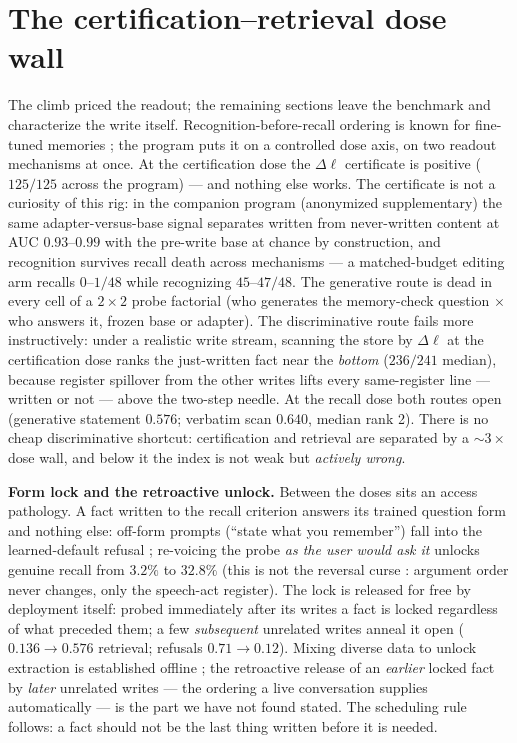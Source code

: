 \documentclass{article}
\newcommand{\dlp}{\Delta\ell}
\begin{document}
\section{The certification--retrieval dose wall}\label{sec:wall}

The climb priced the readout; the remaining sections leave the benchmark and characterize
the write itself. Recognition-before-recall ordering is known for fine-tuned memories
\citep{orhan2023recognition}; the program puts it on a controlled dose axis, on two readout
mechanisms at once. At the certification dose the $\dlp$ certificate is positive
($125/125$ across the program) --- and nothing else works. The certificate is not a
curiosity of this rig: in the companion program (anonymized supplementary) the same
adapter-versus-base signal separates written from never-written content at AUC
$0.93$--$0.99$ with the pre-write base at chance by construction, and recognition
survives recall death across mechanisms --- a matched-budget editing arm recalls
$0$--$1/48$ while recognizing $45$--$47/48$. The generative route is dead in
every cell of a $2{\times}2$ probe factorial (who generates the memory-check question
$\times$ who answers it, frozen base or adapter). The discriminative route fails more
instructively: under a realistic write stream, scanning the store by $\dlp$ at the
certification dose ranks the just-written fact near the \emph{bottom} ($236/241$ median),
because register spillover from the other writes lifts every same-register line ---
written or not --- above the two-step needle. At the recall dose both routes open
(generative statement $0.576$; verbatim scan $0.640$, median rank 2). There is no cheap
discriminative shortcut: certification and retrieval are separated by a ${\sim}3\times$
dose wall, and below it the index is not weak but \emph{actively wrong}.

\textbf{Form lock and the retroactive unlock.} Between the doses sits an access pathology.
A fact written to the recall criterion answers its trained question form and nothing else:
off-form prompts (``state what you remember'') fall into the learned-default refusal
\citep{kang2024unfamiliar}; re-voicing the probe \emph{as the user would ask it} unlocks
genuine recall from $3.2\%$ to $32.8\%$ (this is not the reversal curse
\citep{berglund2024reversal}: argument order never changes, only the speech-act register).
The lock is released for free by deployment itself: probed immediately after its writes a
fact is locked regardless of what preceded them; a few \emph{subsequent} unrelated writes
anneal it open ($0.136 \to 0.576$ retrieval; refusals $0.71 \to 0.12$). Mixing diverse data
to unlock extraction is established offline
\citep{allenzhu2024,chen2024remix,sun2025mixed,wu2026rote}; the retroactive release of an
\emph{earlier} locked fact by \emph{later} unrelated writes --- the ordering a live
conversation supplies automatically --- is the part we have not found stated. The
scheduling rule follows: a fact should not be the last thing written before it is needed.
\end{document}
